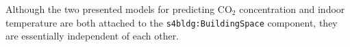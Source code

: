 
Although the two presented models for predicting CO$_2$ concentration and indoor temperature are both attached to the \texttt{s4bldg:BuildingSpace} component, they are essentially independent of each other.





\newpage
\section{}
